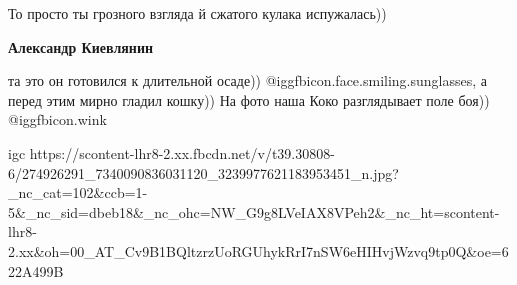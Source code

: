  
 
 
 
 

То просто ты грозного взгляда й сжатого кулака испужалась))

\textbf{Александр Киевлянин}

та это он готовился к длительной осаде)) @igg{fbicon.face.smiling.sunglasses},
а перед этим мирно гладил кошку)) На фото наша Коко разглядывает поле боя))
@igg{fbicon.wink} 

\ifcmt
  igc https://scontent-lhr8-2.xx.fbcdn.net/v/t39.30808-6/274926291_7340090836031120_3239977621183953451_n.jpg?_nc_cat=102&ccb=1-5&_nc_sid=dbeb18&_nc_ohc=NW_G9g8LVeIAX8VPeh2&_nc_ht=scontent-lhr8-2.xx&oh=00_AT_Cv9B1BQltzrzUoRGUhykRrI7nSW6eHIHvjWzvq9tp0Q&oe=622A499B
\fi
